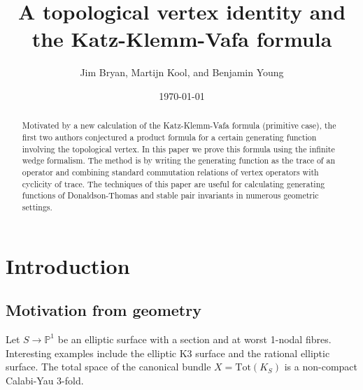 \documentclass{amsart}
\title{A topological vertex identity and the Katz-Klemm-Vafa formula}
\author{Jim Bryan, Martijn Kool, and Benjamin Young}
\date{\today}
\theoremstyle{definition}
\newcommand{\PP} {\mathbb{P}}
\begin{document}
\begin{abstract}
Motivated by a new calculation of the Katz-Klemm-Vafa formula (primitive case), the first two authors conjectured a product formula for a certain generating function involving the topological vertex. In this paper we prove this formula using the infinite wedge formalism. The method is by writing the generating function as the trace of an operator and combining standard commutation relations of vertex operators with cyclicity of trace. 
The techniques of this paper are useful for calculating generating functions of Donaldson-Thomas and stable pair invariants in numerous geometric settings.
\end{abstract}

\maketitle 





\section{Introduction}

\subsection{Motivation from geometry} Let $S \rightarrow \PP^1$ be an elliptic surface with a section and at worst 1-nodal fibres. Interesting examples include the elliptic K3 surface and the rational elliptic surface. The total space of the canonical bundle $X = \mathrm{Tot}(K_S)$ is a non-compact Calabi-Yau 3-fold. 
\end{document}
